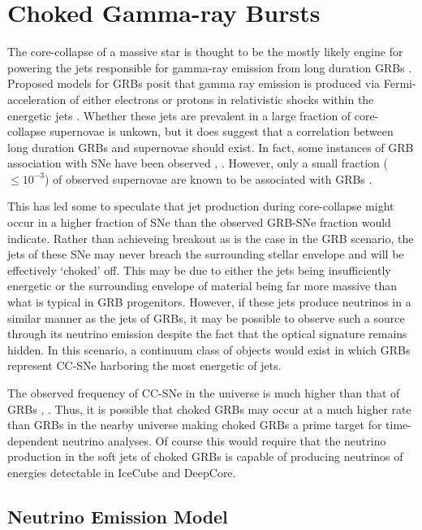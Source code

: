 \documentclass{gatech-thesis}
\begin{document}
\section{Choked Gamma-ray Bursts}
The core-collapse of a massive star is thought to be the mostly likely engine for powering the jets responsible for gamma-ray emission from long duration GRBs \cite{2004RvMP...76.1143P}. Proposed models for GRBs posit that gamma ray emission is produced via Fermi-acceleration of either electrons or protons in relativistic shocks within the energetic jets \cite{2004IJMPA..19.2385Z}. Whether these jets are prevalent in a large fraction of core-collapse supernovae is unkown, but it does suggest that a correlation between long duration GRBs and supernovae should exist. In fact, some instances of GRB association with SNe have been observed \cite{2006ARA&A..44..507W}, \cite{2011AN....332..434M} \cite{2003astro.ph..1006H}. However, only a small fraction ($\leq 10^{-3}$) of observed supernovae are known to be associated with GRBs \cite{2003ApJ...599..408B}. 

This has led some to speculate that jet production during core-collapse might occur in a higher fraction of SNe than the observed GRB-SNe fraction would indicate. Rather than achieveing breakout as is the case in the GRB scenario, the jets of these SNe may never breach the surrounding stellar envelope and will be effectively `choked' off. This may be due to either the jets being insufficiently energetic or the surrounding envelope of material being far more massive than what is typical in GRB progenitors. However, if these jets produce neutrinos in a similar manner as the jets of GRBs, it may be possible to observe such a source through its neutrino emission despite the fact that the optical signature remains hidden. In this scenario, a continuum class of objects would exist in which GRBs represent CC-SNe harboring the most energetic of jets.

The observed frequency of CC-SNe in the universe is much higher than that of GRBs \cite{0004-637X-738-2-154}, \cite{2004RvMP...76.1143P}. Thus, it is possible that choked GRBs may occur at a much higher rate than GRBs in the nearby universe making choked GRBs a prime target for time-dependent neutrino analyses. Of course this would require that the neutrino production in the soft jets of choked GRBs is capable of producing neutrinos of energies detectable in IceCube and DeepCore.

\subsection{Neutrino Emission Model}
\end{document}
